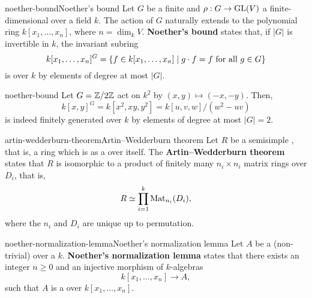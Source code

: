 \begin{topic}{noether-bound}{Noether's bound}
    Let $G$ be a finite  and $\rho : G \to \textup{GL}(V)$ a finite-dimensional  over a field $k$. The action of $G$ naturally extends to the polynomial ring $k[x_1, \ldots, x_n]$, where $n = \dim_k V$. \textbf{Noether's bound} states that, if $|G|$ is invertible in $k$, the invariant subring
    \[ k[x_1, \ldots, x_n]^G = \{ f \in k[x_1, \ldots, x_n] \mid g \cdot f = f \textup{ for all } g \in G \} \]
    is  over $k$ by elements of degree at most $|G|$.
\end{topic}

\begin{example}{noether-bound}
    Let $G = \mathbb{Z}/2\mathbb{Z}$ act on $k^2$ by $(x, y) \mapsto (-x, -y)$. Then,
    \[ k[x, y]^G = k[x^2, xy, y^2] = k[u, v, w] / (w^2 - uv) \]
    is indeed finitely generated over $k$ by elements of degree at most $|G| = 2$.
\end{example}

\begin{topic}{artin-wedderburn-theorem}{Artin--Wedderburn theorem}
    Let $R$ be a semisimple , that is, a ring which is  as a  over itself. The \textbf{Artin--Wedderburn theorem} states that $R$ is isomorphic to a product of finitely many $n_i \times n_i$ matrix rings over  $D_i$, that is,
    \[ R \simeq \prod_{i = 1}^{k} \textup{Mat}_{n_i}(D_i) , \]
    where the $n_i$ and $D_i$ are unique up to permutation.
\end{topic}

\begin{topic}{noether-normalization-lemma}{Noether's normalization lemma}
    Let $A$ be a (non-trivial)  over a  $k$. \textbf{Noether's normalization lemma} states that there exists an integer $n \ge 0$ and an injective morphism of $k$-algebras
    \[ k[x_1, \ldots, x_n] \to A , \]
    such that $A$ is a  over $k[x_1, \ldots, x_n]$.
\end{topic}

